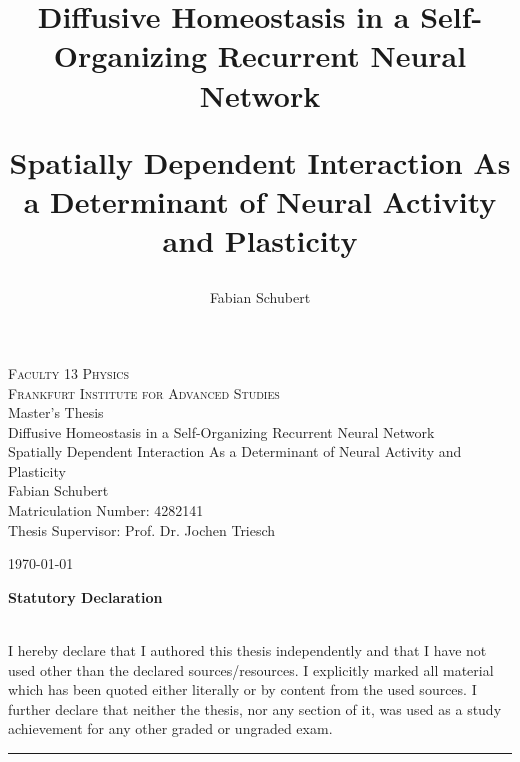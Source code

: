 \documentclass[10pt,a4paper]{article}
\author{Fabian Schubert}
\title{Diffusive Homeostasis in a Self-Organizing Recurrent Neural Network \\
\begin{large}
Spatially Dependent Interaction As a Determinant of Neural Activity and Plasticity
\end{large}
}
\begin{document}
\tabulinesep=1.2mm

\begin{titlepage}
\clearpage
\thispagestyle{empty}
\begin{center}
\LARGE{{\scshape Faculty 13 Physics}\\
  {\scshape Frankfurt Institute for Advanced Studies}\\
  \vspace{1cm}
  Master's Thesis\\}
  \vspace{1cm}
  \huge{Diffusive Homeostasis in a Self-Organizing Recurrent Neural Network}\\
  \vspace{0.5cm}
  \LARGE{Spatially Dependent Interaction As a Determinant of Neural Activity and Plasticity}\\
  \vspace{2cm}
  \LARGE{Fabian Schubert\\
  Matriculation Number: 4282141}\\
  \vspace{2cm}
  Thesis Supervisor: Prof. Dr. Jochen Triesch\\
  \end{center}

\vfill

\begin{center}
{\large \today}
\end{center}
\end{titlepage}

\clearpage

\mbox{}
\thispagestyle{empty}

\newpage

\setcounter{page}{1}

\begin{LARGE}
\noindent\textbf{Statutory Declaration}
\end{LARGE}
\vspace{.5cm}\\
I hereby declare that I authored this thesis independently and that I have
not used other than the declared sources/resources. I explicitly marked all material which has been quoted either literally or by content from the used sources. I further declare that neither the thesis, nor any section of it, was used as a study achievement for any other graded or ungraded exam.  
\vspace{2cm}\\
\rule{\textwidth}{0.4pt}
\end{document}

